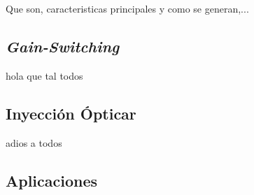 
Que son, caracteristicas principales y como se generan,...

	\subsection{\textit{Gain-Switching}}

		hola que tal todos

	\subsection{Inyección Ópticar}

		adios a todos 

	\subsection{Aplicaciones}


